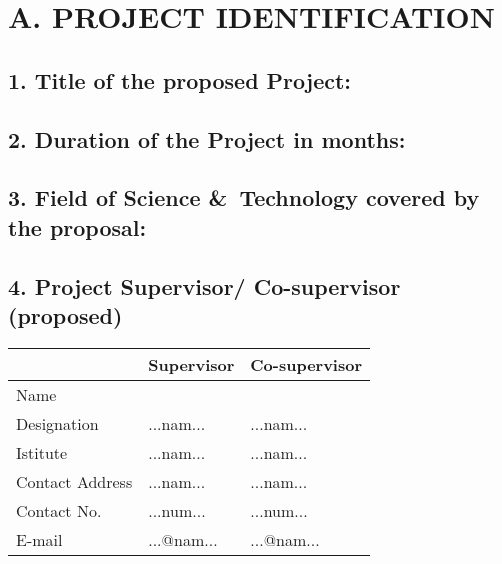 \section*{ A. PROJECT IDENTIFICATION}

\subsection*{ 1. Title of the proposed Project:}


\subsection*{ 2. Duration of the Project in months:}


\subsection*{ 3. Field of Science \&\ Technology covered by the
proposal:}


\subsection*{ 4. Project Supervisor/ Co-supervisor (proposed)}

\begin{table}[H]
	\centering
\begin{tabular}{|l|l|l|}
	\hline
	{} & Supervisor & Co-supervisor \\
	\hline
	Name & \sup & \cosup \\
	Designation & ...nam... & ...nam... \\
	Istitute & ...nam... & ...nam... \\
	Contact Address & ...nam... & ...nam... \\
	Contact No. & ...num... & ...num... \\
	E-mail & ...@nam... & ...@nam... \\
	\hline
\end{tabular}
\end{table}


